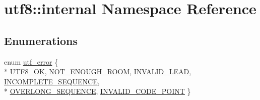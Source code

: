 \hypertarget{namespaceutf8_1_1internal}{}\section{utf8\+:\+:internal Namespace Reference}
\label{namespaceutf8_1_1internal}
\subsection*{Enumerations}
\begin{DoxyCompactItemize}
\item 
enum \hyperlink{namespaceutf8_1_1internal_a9e96c2bc98b37e336b787a281090392c}{utf\+\_\+error} \{ \\*
\hyperlink{namespaceutf8_1_1internal_a9e96c2bc98b37e336b787a281090392cac4d854b29be6992e66c957cf4b957cca}{U\+T\+F8\+\_\+\+OK}, 
\hyperlink{namespaceutf8_1_1internal_a9e96c2bc98b37e336b787a281090392ca86ebad67eed937cd0edbd5a9e5867476}{N\+O\+T\+\_\+\+E\+N\+O\+U\+G\+H\+\_\+\+R\+O\+OM}, 
\hyperlink{namespaceutf8_1_1internal_a9e96c2bc98b37e336b787a281090392ca316f29394dbc76011590cfe20e8ebc21}{I\+N\+V\+A\+L\+I\+D\+\_\+\+L\+E\+AD}, 
\hyperlink{namespaceutf8_1_1internal_a9e96c2bc98b37e336b787a281090392ca0a7c549a77d50c327e177fafc3a8f537}{I\+N\+C\+O\+M\+P\+L\+E\+T\+E\+\_\+\+S\+E\+Q\+U\+E\+N\+CE}, 
\\*
\hyperlink{namespaceutf8_1_1internal_a9e96c2bc98b37e336b787a281090392ca74987a94eef8d6936f8d6475e6605373}{O\+V\+E\+R\+L\+O\+N\+G\+\_\+\+S\+E\+Q\+U\+E\+N\+CE}, 
\hyperlink{namespaceutf8_1_1internal_a9e96c2bc98b37e336b787a281090392ca8591209ee2d80f2d3728ffb82928c3fa}{I\+N\+V\+A\+L\+I\+D\+\_\+\+C\+O\+D\+E\+\_\+\+P\+O\+I\+NT}
 \}
\end{DoxyCompactItemize}
